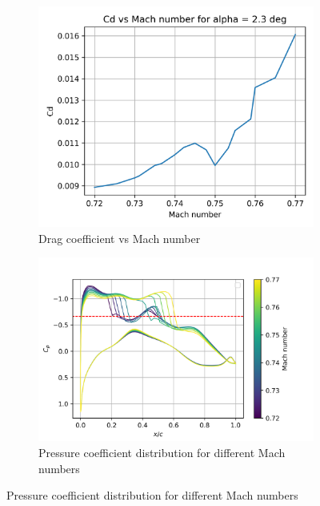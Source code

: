 \documentclass[11pt]{article}
\begin{document}
\begin{figure}
    \centering
    \begin{subfigure}[t]{0.45\textwidth}
        \centering
        \includegraphics[width=\textwidth]{figures/cd_vs_mach.png}
        \caption{Drag coefficient vs Mach number}
        \label{fig:pressure_distribution}
    \end{subfigure}
    \begin{subfigure}[t]{0.54\textwidth}
        \centering
        \includegraphics[width=\textwidth]{figures/cp_vs_xc_machs.png}
        \caption{Pressure coefficient distribution for different Mach numbers}
        \label{fig:mach_distribution}
    \end{subfigure}
\end{figure}
\end{document}
